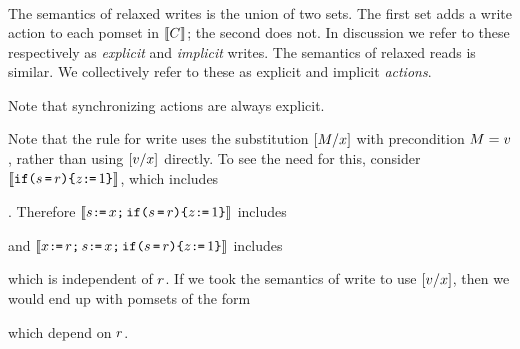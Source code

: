 \begin{align*}
\end{align*}

The semantics of relaxed writes is the union of two sets.  The first set adds
a write action to each pomset in $\llbracket C\rrbracket$; the second does not.  In
discussion we refer to these respectively as \emph{explicit} and
\emph{implicit} writes.  The semantics of relaxed reads is similar.  We
collectively refer to these as explicit and implicit \emph{actions}.

Note that synchronizing actions are always explicit.

Note that the rule for write uses the substitution $[M/x]$ with
precondition $M=v$, rather than using $[v/x]$ directly.
To see the need for this, consider
$\llbracket\texttt{if}\allowbreak\texttt{(}s\,\texttt{=}\,r\texttt{)}\allowbreak\texttt{\{} z\texttt{:}\mkern-1mu\texttt{=}\, 1\texttt{\}}\rrbracket$,
which includes
\begin{tikzinline}[node distance=1em]
\end{tikzinline}.
Therefore
$\llbracket s\texttt{:}\mkern-1mu\texttt{=}\,x\texttt{;}\,\texttt{if}\allowbreak\texttt{(}s\,\texttt{=}\,r\texttt{)}\allowbreak\texttt{\{} z\texttt{:}\mkern-1mu\texttt{=}\, 1\texttt{\}}\rrbracket$
includes
\begin{tikzinline}[node distance=1em]
\end{tikzinline}
and
$\llbracket x\texttt{:}\mkern-1mu\texttt{=}\,r\texttt{;}\,s\texttt{:}\mkern-1mu\texttt{=}\,x\texttt{;}\,\texttt{if}\allowbreak\texttt{(}s\,\texttt{=}\,r\texttt{)}\allowbreak\texttt{\{} z\texttt{:}\mkern-1mu\texttt{=}\, 1\texttt{\}}\rrbracket$
includes
\begin{tikzinline}[node distance=1em]
\end{tikzinline}
which is independent of $r$.
%
If we took the semantics of write to use $[v/x]$, then we would end
up with pomsets of the form
\begin{tikzinline}[node distance=1em]
\end{tikzinline}
which depend on $r$.

